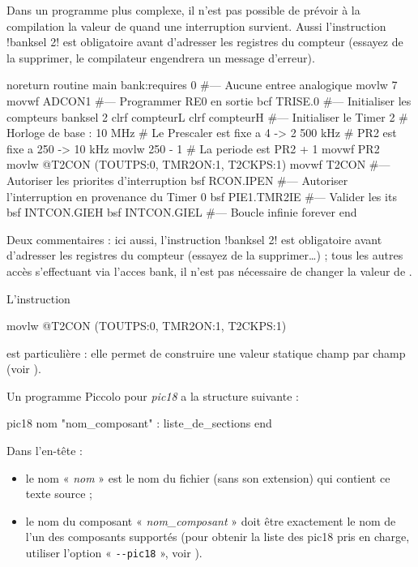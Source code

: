Dans un programme plus complexe, il n’est pas possible de prévoir à la compilation la valeur de  quand une interruption survient. Aussi l’instruction \pic!banksel 2! est obligatoire avant d’adresser les registres du compteur (essayez de la supprimer, le compilateur engendrera un message d'erreur).

\begin{piccolo}
noreturn routine main bank:requires 0 {
#--- Aucune entree analogique
  movlw 7
  movwf ADCON1
#--- Programmer RE0 en sortie
  bcf  TRISE.0
#--- Initialiser les compteurs
  banksel 2
  clrf compteurL
  clrf compteurH
#--- Initialiser le Timer 2
#  Horloge de base : 10 MHz
#  Le Prescaler est fixe a 4 -> 2 500 kHz
#  PR2 est fixe a 250 -> 10 kHz
  movlw  250 - 1 # La periode est PR2 + 1
  movwf  PR2
  movlw  @T2CON (TOUTPS:0, TMR2ON:1, T2CKPS:1)
  movwf  T2CON  
#--- Autoriser les priorites d'interruption
  bsf  RCON.IPEN
#--- Autoriser l'interruption en provenance du Timer 0
  bsf  PIE1.TMR2IE
#--- Valider les its
  bsf  INTCON.GIEH
  bsf  INTCON.GIEL
#--- Boucle infinie
  forever
  end
}
\end{piccolo}

Deux commentaires : ici aussi, l’instruction \pic!banksel 2! est obligatoire avant d’adresser les registres du compteur (essayez de la supprimer…) ; tous les autres accès s’effectuant via l’acces bank, il n’est pas nécessaire de changer la valeur de .

L’instruction
\begin{piccolo}
  movlw  @T2CON (TOUTPS:0, TMR2ON:1, T2CKPS:1)
\end{piccolo}
est particulière : elle permet de construire une valeur statique champ par champ (voir ).








Un programme Piccolo pour \emph{pic18} a la structure suivante :

\begin{piccolo}
pic18 nom "nom_composant" :
  liste_de_sections
end
\end{piccolo}


Dans l’en-tête :
\begin{itemize}
  \item le nom « \emph{nom} » est le nom du fichier (sans son extension) qui contient ce texte source ;
  \item le nom du composant « \emph{nom\_composant} » doit être exactement le nom de l’un des composants supportés (pour obtenir la liste des pic18 pris en charge, utiliser l’option « \texttt{-{}-pic18} », voir ).
\end{itemize}


